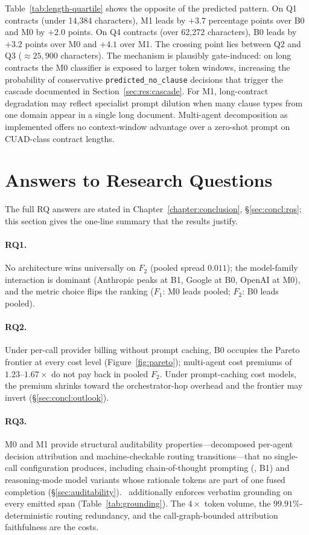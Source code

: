 Table~\ref{tab:length-quartile} shows the opposite of the predicted pattern.
On Q1 contracts (under 14{,}384 characters), M1 leads by $+3.7$ percentage
points over B0 and M0 by $+2.0$ points. On Q4 contracts (over 62{,}272
characters), B0 leads by $+3.2$ points over M0 and $+4.1$ over M1. The
crossing point lies between Q2 and Q3 (${\approx}25{,}900$ characters). The
mechanism is plausibly gate-induced: on long contracts the M0 classifier is
exposed to larger token windows, increasing the probability of conservative
\texttt{predicted\_no\_clause} decisions that trigger the cascade documented
in Section~\ref{sec:res:cascade}. For M1, long-contract degradation may
reflect specialist prompt dilution when many clause types from one domain
appear in a single long document. Multi-agent decomposition as implemented
offers no context-window advantage over a zero-shot prompt on CUAD-class
contract lengths.

\section{Answers to Research Questions}\label{sec:res:rq-summary}

The full RQ answers are stated in Chapter~\ref{chapter:conclusion},
\S\ref{sec:concl:rqs}; this section gives the one-line summary that the
results justify.

\paragraph{RQ1.} No architecture wins universally on $F_2$ (pooled spread
$0.011$); the model-family interaction is dominant (Anthropic peaks at B1,
Google at B0, OpenAI at M0), and the metric choice flips the ranking
($F_1$: M0 leads pooled; $F_2$: B0 leads pooled).

\paragraph{RQ2.} Under per-call provider billing without prompt caching, B0
occupies the Pareto frontier at every cost level (Figure~\ref{fig:pareto});
multi-agent cost premiums of $1.23$--$1.67\times$ do not pay back in pooled
$F_2$. Under prompt-caching cost models, the premium shrinks toward the
orchestrator-hop overhead and the frontier may invert
(\S\ref{sec:concl:outlook}).

\paragraph{RQ3.} M0 and M1 provide structural auditability properties---decomposed
per-agent decision attribution and machine-checkable routing transitions---that
no single-call configuration produces, including chain-of-thought prompting
(\cfgCoT, B1) and reasoning-mode model variants whose rationale tokens are
part of one fused completion (\S\ref{sec:auditability}). \cfgMA\ additionally
enforces verbatim grounding on every emitted span (Table~\ref{tab:grounding}).
The $4\times$ token volume, the $99.91\%$-deterministic routing redundancy, and
the call-graph-bounded attribution faithfulness are the costs.
